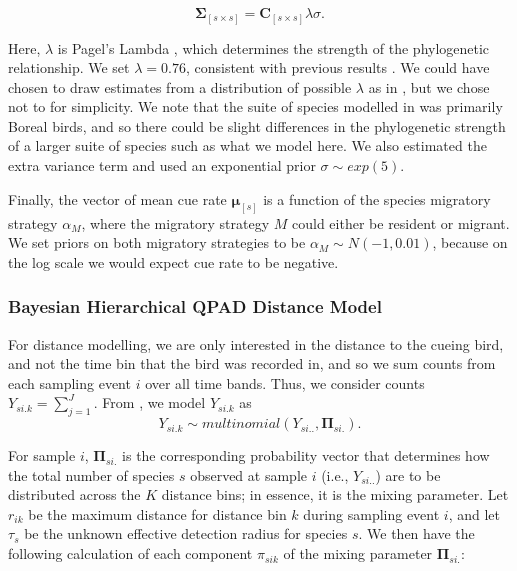 \documentclass[12pt]{article}
\begin{document}
$$\mathbf{\Sigma}_{[s \times s]} = \mathbf{C}_{[s \times s]}\lambda\sigma.$$

\par Here, $\lambda$ is Pagel's Lambda \citep{pagel_inferring_1999}, which determines the strength of the phylogenetic relationship. 
We set $\lambda = 0.76$, consistent with previous results \cite{solymos_phylogeny_2018}. 
We could have chosen to draw estimates from a distribution of possible $\lambda$ as in \citet{solymos_phylogeny_2018}, but we chose not to for simplicity. 
We note that the suite of species modelled in \citet{solymos_evaluating_2018} was primarily Boreal birds, and so there could be slight differences in the phylogenetic strength of a larger suite of species such as what we model here.
We also estimated the extra variance term and used an exponential prior $\sigma \sim exp(5)$.

\par Finally, the vector of mean cue rate $\mathbf{\mu}_{[s]}$ is a function of the species migratory strategy $\alpha_M$, where the migratory strategy $M$ could either be resident or migrant. 
We set priors on both migratory strategies to be $\alpha_M \sim N(-1, 0.01)$, because on the log scale we would expect cue rate to be negative. 

\subsubsection{Bayesian Hierarchical QPAD Distance Model}

\par For distance modelling, we are only interested in the distance to the cueing bird, and not the time bin that the bird was recorded in, and so we sum counts from each sampling event $i$ over all time bands. 
Thus, we consider counts $Y_{si.k} = \sum_{j=1}^{J}$. 
From \citet{solymos_calibrating_2013}, we model $Y_{si.k}$ as
$$Y_{si.k} \sim multinomial\left(Y_{si..}, \mathbf{\Pi}_{si.}\right).$$

\par For sample $i$, $\mathbf{\Pi}_{si.}$ is the corresponding probability vector that determines how the total number of species $s$ observed at sample $i$ (i.e., $Y_{si..}$) are to be distributed across the $K$ distance bins; in essence, it is the mixing parameter. 
Let $r_{ik}$ be the maximum distance for distance bin $k$ during sampling event $i$, and let $\tau_s$ be the unknown effective detection radius for species $s$. 
We then have the following calculation of each component $\pi_{sik}$ of the mixing parameter $\mathbf{\Pi}_{si.}$:
\end{document}
